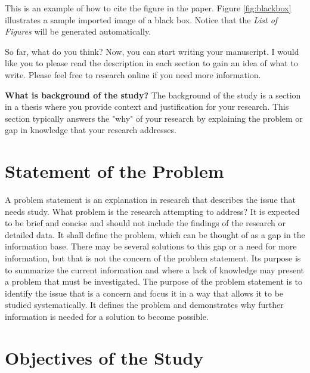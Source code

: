     This is an example of how to cite the figure in the paper. Figure \ref{fig:blackbox} illustrates a sample imported image of a black box. Notice that the \textit{List of Figures} will be generated automatically.


    So far, what do you think? Now, you can start writing your manuscript. I would like you to please read the description in each section to gain an idea of what to write. Please feel free to research online if you need more information.

    \textbf{What is background of the study?}
    The background of the study is a section in a thesis where you provide context and justification for your research. This section typically answers the "why" of your research by explaining the problem or gap in knowledge that your research addresses.

    
\section{Statement of the Problem}
    \label{sec:Statement of the Problem}

    A problem statement is an explanation in research that describes the issue that needs study. What problem is the research attempting to address? It is expected to be brief and concise and should not include the findings of the research or detailed data. It shall define the problem, which can be thought of as a gap in the information base. There may be several solutions to this gap or a need for more information, but that is not the concern of the problem statement. Its purpose is to summarize the current information and where a lack of knowledge may present a problem that must be investigated. The purpose of the problem statement is to identify the issue that is a concern and focus it in a way that allows it to be studied systematically. It defines the problem and demonstrates why further information is needed for a solution to become possible.



\section{Objectives of the Study}
    \label{sec:Objectives of the Study}

